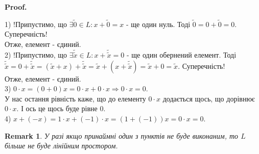 \documentclass[a4paper, 10pt]{article}
\makeatletter
\theoremstyle{theoremdd}
\newtheorem{remark}[theorem]{Remark}
\renewenvironment{proof}[1][Proof.\\]{\par
\pushQED{\hfill \qed}%
\normalfont \topsep6\p@\@plus6\p@\relax
\trivlist
\item\relax
{\bfseries
#1\@addpunct{.}}\hspace\labelsep\ignorespaces
}{%
\popQED\endtrivlist\@endpefalse
}
\makeatother
\begin{document}
	\begin{proof}
	1) !Припустимо, що $\exists \tilde{0} \in L: x + \tilde{0} = x$ - ще один нуль. Тоді $\tilde{0} = 0 + \tilde{0} = 0$. Суперечність! \\
	Отже, елемент - єдиний.
	\bigskip \\
	2) !Припустимо, що $\exists \tilde{\tilde{x}} \in L: x + \tilde{\tilde{x}} = 0$ - ще один обернений елемент. Тоді $\tilde{\tilde{x}} = 0 + \tilde{\tilde{x}} = (\tilde{x} + x) + \tilde{\tilde{x}} = \tilde{x} + (x + \tilde{\tilde{x}}) = \tilde{x} + 0 = \tilde{x}$. Суперечність! \\
	Отже, елемент - єдиний.
	\bigskip \\
	3) $0 \cdot x = (0 + 0)x = 0\cdot x + 0 \cdot x \Rightarrow 0 \cdot x = 0$. \\
	У нас остання рівність каже, що до елементу $0 \cdot x$ додається щось, що дорівнює $0 \cdot x$. І ось це щось буде рівне $0$.
	\bigskip \\
	4) $x + (-x) = 1 \cdot x + (-1) \cdot x = (1 + (-1))x = 0 \cdot x = 0$.
	\end{proof}
	
	\begin{remark}
	У разі якщо принаймні один з пунктів не буде виконаним, то $L$ більше не буде лінійним простором.
	\end{remark}
	
\end{document}
